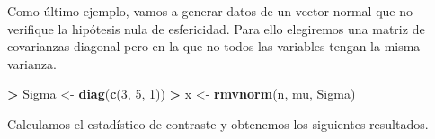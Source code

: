 \documentclass[
  a4paper,
  oneside]{scrbook}
\newenvironment{Shaded}{\begin{snugshade}}{\end{snugshade}}
\newcommand{\DecValTok}[1]{\textcolor[rgb]{0.00,0.00,0.81}{#1}}
\newcommand{\FloatTok}[1]{\textcolor[rgb]{0.00,0.00,0.81}{#1}}
\newcommand{\FunctionTok}[1]{\textcolor[rgb]{0.13,0.29,0.53}{\textbf{#1}}}
\newcommand{\NormalTok}[1]{#1}
\newcommand{\OtherTok}[1]{\textcolor[rgb]{0.56,0.35,0.01}{#1}}
\newcommand{\SpecialCharTok}[1]{\textcolor[rgb]{0.81,0.36,0.00}{\textbf{#1}}}
\theoremstyle{definition}
\theoremstyle{definition}
\theoremstyle{definition}
\theoremstyle{definition}
\theoremstyle{remark}
\begin{document}
\normalsize

Como último ejemplo, vamos a generar datos de un vector normal que no
verifique la hipótesis nula de esfericidad. Para ello elegiremos una
matriz de covarianzas diagonal pero en la que no todos las variables
tengan la misma varianza.

\footnotesize

\begin{Shaded}
\begin{Highlighting}[]
\SpecialCharTok{\textgreater{}}\NormalTok{ Sigma }\OtherTok{\textless{}{-}} \FunctionTok{diag}\NormalTok{(}\FunctionTok{c}\NormalTok{(}\DecValTok{3}\NormalTok{, }\DecValTok{5}\NormalTok{, }\DecValTok{1}\NormalTok{))}
\SpecialCharTok{\textgreater{}}\NormalTok{ x }\OtherTok{\textless{}{-}} \FunctionTok{rmvnorm}\NormalTok{(n, mu, Sigma)}
\end{Highlighting}
\end{Shaded}

\normalsize

Calculamos el estadístico de contraste y obtenemos los siguientes
resultados.

\footnotesize

\begin{Shaded}
\end{Shaded}
\end{document}
